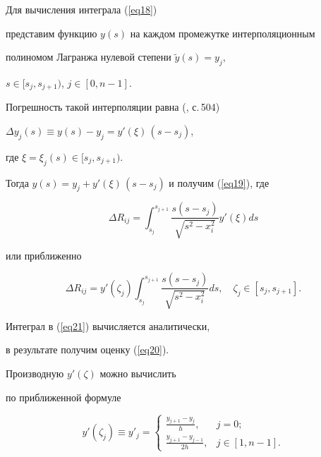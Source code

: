 \begin{pf}


Для вычисления интеграла (\ref{eq18})


представим функцию $y(s)$ на каждом промежутке интерполяционным


полиномом Лагранжа нулевой степени $\widetilde y(s)=y_j$,


$s\in[s_j,s_{j+1})$, $j\in[0,n-1]$.


Погрешность такой интерполяции равна (\cite{bs}, с.\,504)


$\Delta y_j(s)\equiv y(s)-y_j=y'(\xi)\,(s-s_j)$,


где $\xi=\xi_j(s)\in[s_j,s_{j+1})$.


Тогда $y(s)=y_j+y'(\xi)\,(s-s_j)$ и получим (\ref{eq19}), где


$$


\Delta R_{ij}=\int_{s_j}^{s_{j+1}}\frac{s(s-s_j)}


{\sqrt{s^2-x_i^2}}y'(\xi)ds


$$


или приближенно


\begin{equation}


\label{eq21}


\Delta R_{ij}=y'(\zeta_j)\int_{s_j}^{s_{j+1}}\frac{s(s-s_j)}


{\sqrt{s^2-x_i^2}}ds,


\quad \zeta_j\in[s_j,s_{j+1}].


\end{equation}





Интеграл в (\ref{eq21}) вычисляется аналитически,


в результате получим оценку (\ref{eq20}).


\end{pf}





\begin{note}


Производную $y'(\zeta)$ можно вычислить


по приближенной формуле


\begin{equation}


\label{eq22}


y'(\zeta_j)\equiv y'_j=\begin{cases}


\frac{y_{j+1}-y_j}{h}, & j=0; \\[2mm]


\frac{y_{j+1}-y_{j-1}}{2h}, & j\in[1,n-1].


\end{cases}


\end{equation}


\end{note}





